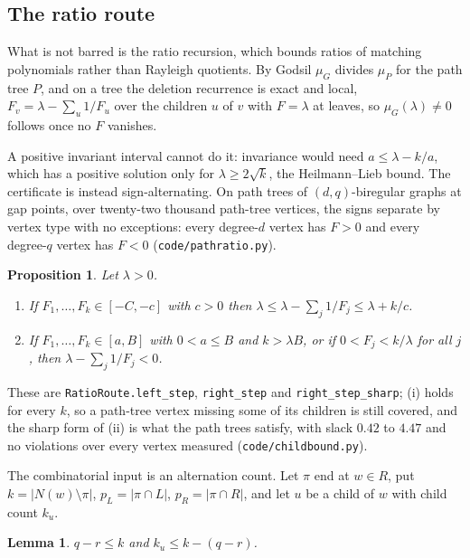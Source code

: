 \documentclass[11pt]{article}
\newtheorem{lemma}[theorem]{Lemma}
\newtheorem{proposition}[theorem]{Proposition}
\theoremstyle{remark}
\begin{document}
\subsection{The ratio route}\label{sec:ratio}

What is not barred is the ratio recursion, which bounds ratios of matching polynomials rather
than Rayleigh quotients. By Godsil $\mu_G$ divides $\mu_P$ for the path tree $P$, and on a tree
the deletion recurrence is exact and local, $F_v=\lambda-\sum_u 1/F_u$ over the children $u$ of
$v$ with $F=\lambda$ at leaves, so $\mu_G(\lambda)\ne0$ follows once no $F$ vanishes.

A positive invariant interval cannot do it: invariance would need $a\le\lambda-k/a$, which has a
positive solution only for $\lambda\ge2\sqrt k$, the Heilmann--Lieb bound. The certificate is
instead sign-alternating. On path trees of $(d,q)$-biregular graphs at gap points, over
twenty-two thousand path-tree vertices, the signs separate by vertex type with no exceptions:
every degree-$d$ vertex has $F>0$ and every degree-$q$ vertex has $F<0$ (\texttt{code/pathratio.py}).

\begin{proposition}\label{prop:ratiosteps}
Let $\lambda>0$.
\begin{enumerate}
\item[(i)] If $F_1,\dots,F_k\in[-C,-c]$ with $c>0$ then $\lambda\le\lambda-\sum_j1/F_j\le\lambda+k/c$.
\item[(ii)] If $F_1,\dots,F_k\in[a,B]$ with $0<a\le B$ and $k>\lambda B$, or if
$0<F_j<k/\lambda$ for all $j$, then $\lambda-\sum_j1/F_j<0$.
\end{enumerate}
\end{proposition}

These are \texttt{RatioRoute.left\_step}, \texttt{right\_step} and \texttt{right\_step\_sharp};
(i) holds for every $k$, so a path-tree vertex missing some of its children is still covered, and
the sharp form of (ii) is what the path trees satisfy, with slack $0.42$ to $4.47$ and no
violations over every vertex measured (\texttt{code/childbound.py}).

The combinatorial input is an alternation count. Let $\pi$ end at $w\in R$, put
$k=|N(w)\setminus\pi|$, $p_L=|\pi\cap L|$, $p_R=|\pi\cap R|$, and let $u$ be a child of $w$ with
child count $k_u$.

\begin{lemma}\label{lem:blocking}
$q-r\le k$ and $k_u\le k-(q-r)$.
\end{lemma}
\end{document}
